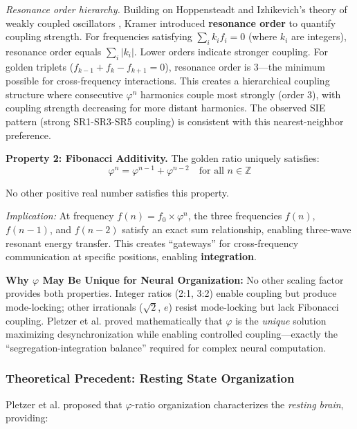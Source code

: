 \documentclass[11pt,a4paper]{article}
\newcommand{\phisym}{\varphi}
\begin{document}
\textit{Resonance order hierarchy.} Building on Hoppensteadt and Izhikevich's theory of weakly coupled oscillators \parencite{hoppensteadt1997weakly}, Kramer introduced \textbf{resonance order} to quantify coupling strength. For frequencies satisfying $\sum_i k_i f_i = 0$ (where $k_i$ are integers), resonance order equals $\sum_i |k_i|$. Lower orders indicate stronger coupling. For golden triplets ($f_{k-1} + f_k - f_{k+1} = 0$), resonance order is 3---the minimum possible for cross-frequency interactions. This creates a hierarchical coupling structure where consecutive $\phisym^n$ harmonics couple most strongly (order 3), with coupling strength decreasing for more distant harmonics. The observed SIE pattern (strong SR1-SR3-SR5 coupling) is consistent with this nearest-neighbor preference.

\textbf{Property 2: Fibonacci Additivity.}
The golden ratio uniquely satisfies:
\begin{equation}
\phisym^n = \phisym^{n-1} + \phisym^{n-2} \quad \text{for all } n \in \mathbb{Z}
\end{equation}

No other positive real number satisfies this property.

\textit{Implication:} At frequency $f(n) = f_0 \times \phisym^n$, the three frequencies $f(n)$, $f(n-1)$, and $f(n-2)$ satisfy an exact sum relationship, enabling three-wave resonant energy transfer. This creates ``gateways'' for cross-frequency communication at specific positions, enabling \textbf{integration}.

\begin{keyinsight}
\textbf{Why $\phisym$ May Be Unique for Neural Organization:}
No other scaling factor provides both properties. Integer ratios (2:1, 3:2) enable coupling but produce mode-locking; other irrationals ($\sqrt{2}$, $e$) resist mode-locking but lack Fibonacci coupling. Pletzer et al. \parencite{pletzer2010golden} proved mathematically that $\phisym$ is the \textit{unique} solution maximizing desynchronization while enabling controlled coupling---exactly the ``segregation-integration balance'' required for complex neural computation.
\end{keyinsight}

\subsubsection{Theoretical Precedent: Resting State Organization}

Pletzer et al. \parencite{pletzer2010golden} proposed that $\phisym$-ratio organization characterizes the \textit{resting brain}, providing:
\end{document}
